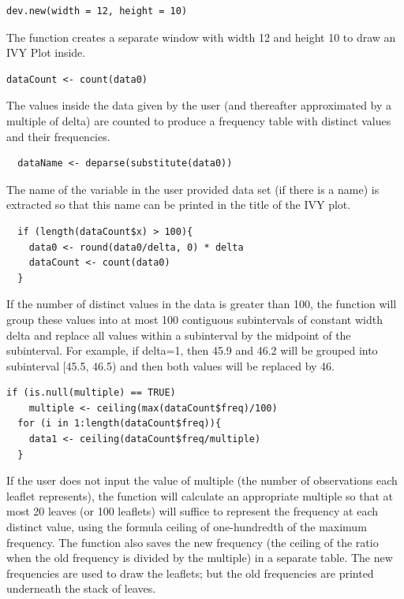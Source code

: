 \begin{verbatim}
dev.new(width = 12, height = 10)
\end{verbatim}

The function creates a separate window with width 12 and height 10 to
draw an IVY Plot inside.

\begin{verbatim}
dataCount <- count(data0)
\end{verbatim}

The values inside the data given by the user (and thereafter
approximated by a multiple of delta) are counted to produce a frequency
table with distinct values and their frequencies.

\begin{verbatim}
  dataName <- deparse(substitute(data0))
\end{verbatim}

The name of the variable in the user provided data set (if there is a
name) is extracted so that this name can be printed in the title of the
IVY plot.

\begin{verbatim}
  if (length(dataCount$x) > 100){
    data0 <- round(data0/delta, 0) * delta
    dataCount <- count(data0)
  }
\end{verbatim}

If the number of distinct values in the data is greater than 100, the
function will group these values into at most 100 contiguous
subintervals of constant width delta and replace all values within a
subinterval by the midpoint of the subinterval. For example, if delta=1,
then 45.9 and 46.2 will be grouped into subinterval {[}45.5, 46.5) and
then both values will be replaced by 46.

\begin{verbatim}
if (is.null(multiple) == TRUE)
    multiple <- ceiling(max(dataCount$freq)/100)
  for (i in 1:length(dataCount$freq)){
    data1 <- ceiling(dataCount$freq/multiple)
  }
\end{verbatim}

If the user does not input the value of multiple (the number of
observations each leaflet represents), the function will calculate an
appropriate multiple so that at most 20 leaves (or 100 leaflets) will
suffice to represent the frequency at each distinct value, using the
formula ceiling of one-hundredth of the maximum frequency. The function
also saves the new frequency (the ceiling of the ratio when the old
frequency is divided by the multiple) in a separate table. The new
frequencies are used to draw the leaflets; but the old frequencies are
printed underneath the stack of leaves.

